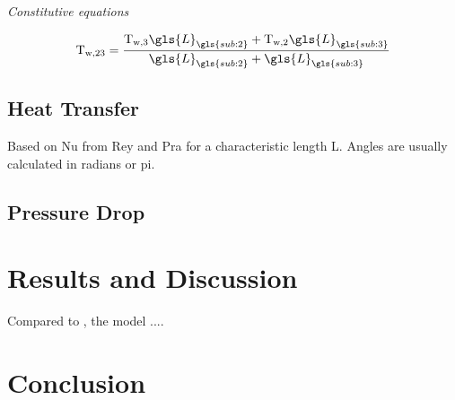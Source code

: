 \documentclass[11pt]{article} %
\begin{document}
\begin{center}
\textit{Constitutive equations}
\end{center}

\begin{equation}
\text{T}_\text{w,23} = \frac{   \text{T}_\text{w,3} \gls{L}_{\gls{sub:2}}  + \text{T}_\text{w,2}\gls{L}_{\gls{sub:3}}      }{  \gls{L}_{\gls{sub:2}} + \gls{L}_{\gls{sub:3}}         } 
\end{equation}



\subsection{Heat Transfer}

Based on \gls{Nu} from \gls{Rey} and \gls{Pra} for a characteristic length \gls{L}. Angles are usually calculated in radians or \gls{pi}.


\subsection{Pressure Drop}



\section{Results and Discussion}

Compared to \cite{Kaern2011b}, the model .... 


\cite{Zhang2006}

\cite{Zhang2009}

\section{Conclusion}
\end{document}
